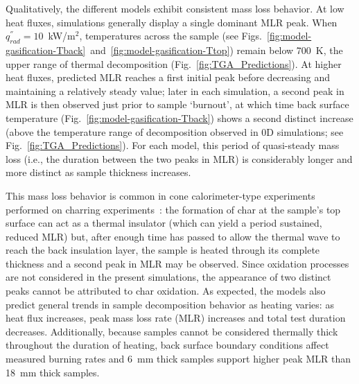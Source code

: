 \documentclass{article}
\begin{document}
Qualitatively, the different models exhibit consistent mass loss behavior. At low heat fluxes, simulations generally display a single dominant MLR peak. When $q^{''}_{rad}=10$~kW/m$^2$, temperatures across the sample (see Figs.~\ref{fig:model-gasification-Tback}~and~\ref{fig:model-gasification-Ttop}) remain below 700~K, the upper range of thermal decomposition (Fig.~\ref{fig:TGA_Predictions}). At higher heat fluxes, predicted MLR reaches a first initial peak before decreasing and maintaining a relatively steady value; later in each simulation, a second peak in MLR is then observed just prior to sample `burnout', at which time back surface temperature (Fig.~\ref{fig:model-gasification-Tback}) shows a second distinct increase (above the temperature range of decomposition observed in 0D simulations; see Fig.~\ref{fig:TGA_Predictions}). For each model, this period of quasi-steady mass loss (i.e., the duration between the two peaks in MLR) is considerably longer and more distinct as sample thickness increases. 

This mass loss behavior is common in cone calorimeter-type experiments performed on charring experiments~\cite{SFPEHandbookCone}: the formation of char at the sample's top surface can act as a thermal insulator (which can yield a period sustained, reduced MLR) but, after enough time has passed to allow the thermal wave to reach the back insulation layer, the sample is heated through its complete thickness and a second peak in MLR may be observed. Since oxidation processes are not considered in the present simulations, the appearance of two distinct peaks cannot be attributed to char oxidation. 
As expected, the models also predict general trends in sample decomposition behavior as heating varies: as heat flux increases, peak mass loss rate (MLR) increases and total test duration decreases. Additionally, because samples cannot be considered thermally thick throughout the duration of heating, back surface boundary conditions affect measured burning rates and 6~mm thick samples support higher peak MLR than 18~mm thick samples.
\end{document}

